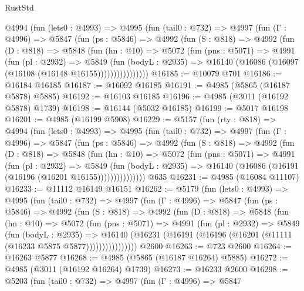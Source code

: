 \begin{lexlean}{RustStd}
\begin{coremodule}
      @4994
        (fun (lets0 : @4993) =>
        @4995
          (fun (tail0 : @732) =>
          @4997
            (fun (Γ : @4996) =>
            @5847
              (fun (ps : @5846) =>
              @4992
                (fun (S : @818) =>
                @4992
                  (fun (D : @818) =>
                  @5848
                    (fun (hn : @10) =>
                    @5072
                      (fun (pns : @5071) =>
                      @4991
                        (fun (pl : @2932) =>
                        @5849
                          (fun (bodyL : @2935) =>
                          @16140 (@16086 (@16097 (@16108 (@16148 @16155))))))))))))))))
@16185 := @10079 @701
@16186 := @16184 @16185
@16187 := @16092 @16185
@16191 := @4985 (@5865 (@16187 @5878) @5885)
@16192 := @16103 @16185
@16196 := @4985 (@3011 (@16192 @5878) @1739)
@16198 := @16144 (@5032 @16185)
@16199 := @5017 @16198
@16201 := @4985 (@16199 @5908)
@16229 := @5157
    (fun (rty : @818) =>
    @4994
      (fun (lets0 : @4993) =>
      @4995
        (fun (tail0 : @732) =>
        @4997
          (fun (Γ : @4996) =>
          @5847
            (fun (ps : @5846) =>
            @4992
              (fun (S : @818) =>
              @4992
                (fun (D : @818) =>
                @5848
                  (fun (hn : @10) =>
                  @5072
                    (fun (pns : @5071) =>
                    @4991
                      (fun (pl : @2932) =>
                      @5849
                        (fun (bodyL : @2935) =>
                        @16140 (@16086 (@16191 (@16196 (@16201 @16155)))))))))))))))
    @635
@16231 := @4985 (@16084 @11107)
@16233 := @11112 @16149 @16151
@16262 := @5179
    (fun (lets0 : @4993) =>
    @4995
      (fun (tail0 : @732) =>
      @4997
        (fun (Γ : @4996) =>
        @5847
          (fun (ps : @5846) =>
          @4992
            (fun (S : @818) =>
            @4992
              (fun (D : @818) =>
              @5848
                (fun (hn : @10) =>
                @5072
                  (fun (pns : @5071) =>
                  @4991
                    (fun (pl : @2932) =>
                    @5849
                      (fun (bodyL : @2935) =>
                      @16140
                        (@16231 (@16191 (@16196 (@16201 (@11111 (@16233 @5875 @5877))))))))))))))))
    @2600
@16263 := @723 @2600
@16264 := @16263 @5877
@16268 := @4985 (@5865 (@16187 @16264) @5885)
@16272 := @4985 (@3011 (@16192 @16264) @1739)
@16273 := @16233 @2600
@16298 := @5203
    (fun (tail0 : @732) =>
    @4997
      (fun (Γ : @4996) =>
      @5847

\end{coremodule}
\end{lexlean}
